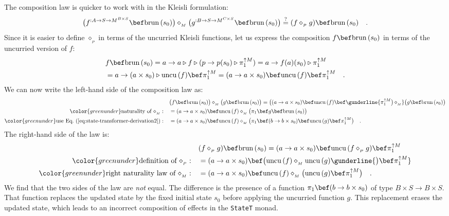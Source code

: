 The composition law is quicker to work with in the Kleisli formulation:
\[
\big(f^{:A\rightarrow S\rightarrow M^{B\times S}}\bef\text{brun}\,(s_{0})\big)\diamond_{_{M}}\big(g^{:B\rightarrow S\rightarrow M^{C\times S}}\bef\text{brun}\,(s_{0})\big)\overset{?}{=}(f\diamond_{_{P}}g)\bef\text{brun}\,(s_{0})\quad.
\]
Since it is easier to define $\diamond_{_{P}}$ in terms of the uncurried
Kleisli functions, let us express the composition $f\bef\text{brun}\,(s_{0})$
in terms of the uncurried version of $f$:
\begin{align}
 & f\bef\text{brun}\,(s_{0})=a\rightarrow a\triangleright f\triangleright(p\rightarrow p(s_{0})\triangleright\pi_{1}^{\uparrow M})=a\rightarrow f(a)(s_{0})\triangleright\pi_{1}^{\uparrow M}\nonumber \\
 & =a\rightarrow(a\times s_{0})\triangleright\text{uncu}\,(f)\bef\pi_{1}^{\uparrow M}=(a\rightarrow a\times s_{0})\bef\text{uncu}\,(f)\bef\pi_{1}^{\uparrow M}\quad.\label{eq:state-transformer-derivation2}
\end{align}
We can now write the left-hand side of the composition law as:
\begin{align*}
 & \big(f\bef\text{brun}\,(s_{0})\big)\diamond_{_{M}}\big(g\bef\text{brun}\,(s_{0})\big)=\big((a\rightarrow a\times s_{0})\bef\text{uncu}\,(f)\bef\gunderline{\pi_{1}^{\uparrow M}\big)\,\diamond_{_{M}}}\big(g\bef\text{brun}\,(s_{0})\big)\\
{\color{greenunder}\text{naturality of }\diamond_{_{M}}:}\quad & =(a\rightarrow a\times s_{0})\bef\text{uncu}\,(f)\diamond_{_{M}}\big(\pi_{1}\bef g\bef\text{brun}\,(s_{0})\big)\\
{\color{greenunder}\text{use Eq.~(\ref{eq:state-transformer-derivation2})}:}\quad & =(a\rightarrow a\times s_{0})\bef\text{uncu}\,(f)\diamond_{_{M}}\big(\pi_{1}\bef(b\rightarrow b\times s_{0})\bef\text{uncu}\,(g)\bef\pi_{1}^{\uparrow M}\big)\quad.
\end{align*}
The right-hand side of the law is:
\begin{align*}
 & (f\diamond_{_{P}}g)\bef\text{brun}\,(s_{0})=(a\rightarrow a\times s_{0})\bef\text{uncu}\,(f\diamond_{_{P}}g)\bef\pi_{1}^{\uparrow M}\\
{\color{greenunder}\text{definition of }\diamond_{_{P}}:}\quad & =(a\rightarrow a\times s_{0})\bef\big(\text{uncu}\,(f)\diamond_{_{M}}\text{uncu}\,(g)\gunderline{\big)\bef\pi_{1}^{\uparrow M}}\\
{\color{greenunder}\text{right naturality law of }\diamond_{_{M}}:}\quad & =(a\rightarrow a\times s_{0})\bef\text{uncu}\,(f)\diamond_{_{M}}\big(\text{uncu}\,(g)\bef\pi_{1}^{\uparrow M}\big)\quad.
\end{align*}
We find that the two sides of the law are \emph{not} equal. The difference
is the presence of a function $\pi_{1}\bef(b\rightarrow b\times s_{0})$
of type $B\times S\rightarrow B\times S$. That function replaces
the updated state by the fixed initial state $s_{0}$ before applying
the uncurried function $g$. This replacement erases the updated state,
which leads to an incorrect composition of effects in the \lstinline!StateT!
monad.

